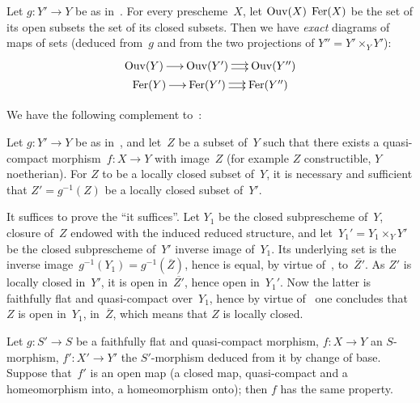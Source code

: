 \begin{corollary}
\label{VIII.4.4}
Let
$g\colon Y'{\to} Y$ be as in~. For every
prescheme~$X$, let $\operatorname{Ouv}(X)$ \resp $\operatorname{Fer}(X)$ be the set of its open
subsets \resp the set of its closed subsets. Then we have
\emph{exact} diagrams of maps of sets (deduced from~$g$ and from the
two projections of $Y''=Y'\times_{Y}Y'$):
\vspace*{-5pt}
\begin{gather*}
\xymatrix@C=.5cm{\Ouv(Y)\ar[r] & \Ouv(Y')\ar@<2pt>[r]\ar@<-2pt>[r] &
\Ouv(Y'')}\\[-3pt]
\xymatrix@C=.5cm{\Fer(Y)\ar[r] & \Fer(Y')\ar@<2pt>[r]\ar@<-2pt>[r] &
\Fer(Y'')}
\end{gather*}
\end{corollary}

We have the following complement to~:

\begin{corollary}
\label{VIII.4.5}
Let $g\colon Y'\to Y$ be as in~, and let~$Z$ be a
subset of~$Y$ such that there exists a quasi-compact
morphism~$f\colon X\to Y$ with image~$Z$ (for example $Z$
constructible, $Y$ noetherian). For $Z$ to be a locally closed
subset of~$Y$, it is necessary and sufficient that $Z'=g^{-1}(Z)$ be
a locally closed subset of~$Y'$.
\end{corollary}

It suffices to prove the ``it suffices''. Let $Y_{1}$ be the closed
subprescheme of~$Y$, closure of~$Z$ endowed with the induced reduced
structure, and let~$Y_{1}'=Y_{1}\times_{Y}Y'$ be the closed
subprescheme of~$Y'$ inverse image of~$Y_{1}$. Its underlying set is
the inverse image~$g^{-1}(Y_{1})=g^{-1}(\overline{Z})$, hence is
equal, by virtue of~, to~$\overline{Z'}$. As $Z'$ is
locally closed in~$Y'$, it is open in~$\overline{Z'}$, hence open
in~$Y_{1}'$. Now the latter is faithfully flat and quasi-compact
over~$Y_{1}$, hence by virtue of~ one concludes
that~$Z$ is open in~$Y_{1}$, \ie in~$\overline{Z}$, which means that
$Z$ is locally closed.

\begin{corollary}
\label{VIII.4.6}
Let $g\colon S'\to S$ be a faithfully flat and quasi-compact
morphism, $f\colon X\to Y$ an $S$-morphism, $f'\colon X'\to Y'$ the
$S'$-morphism deduced from it by change of base. Suppose that~$f'$ is
an open map (\resp a closed map, \resp quasi-compact and a
homeomorphism into, \resp a homeomorphism onto); then $f$ has the
same property.
\end{corollary}

